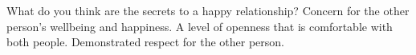 What do you think are the secrets to a happy relationship?
Concern for the other person's wellbeing and happiness.
A level of openness that is comfortable with both people.
Demonstrated respect for the other person.




